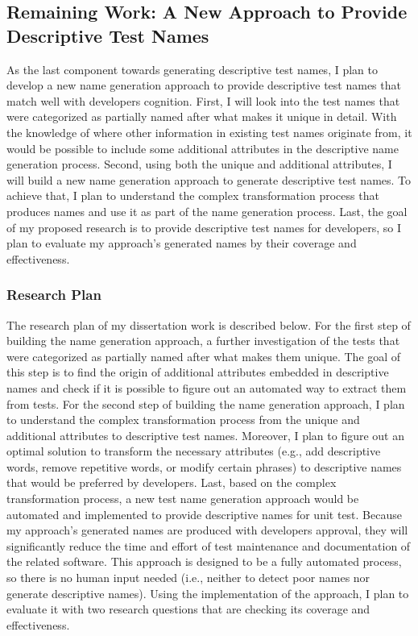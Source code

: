 \subsection{Remaining Work: A New Approach to Provide Descriptive Test Names}
\label{sec:remaining-work}

As the last component towards generating descriptive test names, I plan to develop a new name generation approach to provide descriptive test names that match well with developers cognition.
%
First, I will look into the test names that were categorized as partially named after what makes it unique in detail.
%
With the knowledge of where other information in existing test names originate from, it would be possible to include some additional attributes in the descriptive name generation process.
%
Second, using both the unique and additional attributes, I will build a new name generation approach to generate descriptive test names.
%
To achieve that, I plan to understand the complex transformation process that produces names and use it as part of the name generation process.
%
Last, the goal of my proposed research is to provide descriptive test names for developers, so I plan to evaluate my approach's generated names by their coverage and effectiveness.


\subsubsection{Research Plan}

The research plan of my dissertation work is described below.
%
For the first step of building the name generation approach, a further investigation of the tests that were categorized as partially named after what makes them unique.
%
The goal of this step is to find the origin of additional attributes embedded in descriptive names and check if it is possible to figure out an automated way to extract them from tests.
%
For the second step of building the name generation approach, I plan to understand the complex transformation process from the unique and additional attributes to descriptive test names.
%
Moreover, I plan to figure out an optimal solution to transform the necessary attributes (e.g., add descriptive words, remove repetitive words, or modify certain phrases) to descriptive names that would be preferred by developers.
%
Last, based on the complex transformation process, a new test name generation approach would be automated and implemented to provide descriptive names for unit test.
%
Because my approach's generated names are produced with developers approval, they will significantly reduce the time and effort of test maintenance and documentation of the related software.
%
This approach is designed to be a fully automated process, so there is no human input needed (i.e., neither to detect poor names nor generate descriptive names).
%
Using the implementation of the approach, I plan to evaluate it with two research questions that are checking its coverage and effectiveness.


